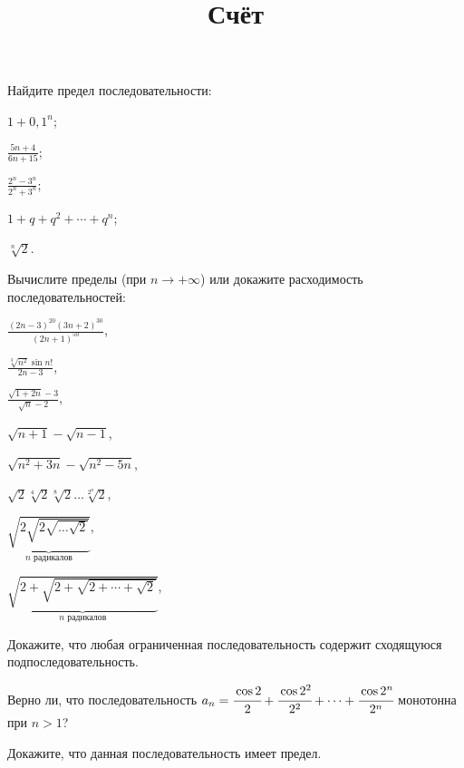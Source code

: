 \documentclass[a4paper, 12pt, num=31]{listok}
\begin{document}
\title{Счёт}
\maketitle{}
\begin{problem}
    Найдите предел последовательности:
    \begin{probparts}
        \item $1 + {0{,}1}^n$;
        \item $\frac{5n + 4}{6n + 15}$;
        \item $\frac{2^n - 3^n}{2^n + 3^n}$;
        \item $1 + q + q^2 + \cdots + q^n$;
        \item $\sqrt[n]{2}$.
    \end{probparts}
\end{problem}
\begin{problem}
    Вычислите пределы (при $n \to + \infty$) или докажите расходимость последовательностей:
    \begin{probparts}
        \item $\frac{{(2n - 3)}^{20} {(3n + 2)}^{30}}{{(2n + 1)}^{50}}$,
        \item $\frac{\sqrt[3]{n^2}\sin{n!}}{2n - 3}$,
        \item $\frac{\sqrt{1 + 2n} - 3}{\sqrt n - 2}$,
        \item $\sqrt{n + 1} - \sqrt{n - 1}$,
        \item $\sqrt{n^2 + 3n} - \sqrt{n^2 - 5n}$,
        \item $\sqrt2\sqrt[4]2\sqrt[8]2\dots\sqrt[2^n]2$,
        \item $\underbrace{\sqrt{2\sqrt{2\sqrt{\dots\sqrt 2}}}}_{\text{$n$ радикалов}}$,
        \item $\underbrace{\sqrt{2 + \sqrt{2 + \sqrt{2 + \cdots + \sqrt 2}}}}_{\text{$n$ радикалов}}$,
    \end{probparts}
\end{problem}
\begin{problem}[(у)]
    Докажите, что любая ограниченная последовательность содержит сходящуюся подпоследовательность.
\end{problem}
\begin{problem}
\begin{probparts}
    \item Верно ли, что последовательность $a_n = \cfrac{\cos2}2 + \cfrac{\cos 2^2}{2^2} + \cdots + \cfrac{\cos 2^n}{2^n}$ монотонна при $n > 1$?
    \item Докажите, что данная последовательность имеет предел.
\end{probparts}
\end{problem}
\end{document}
